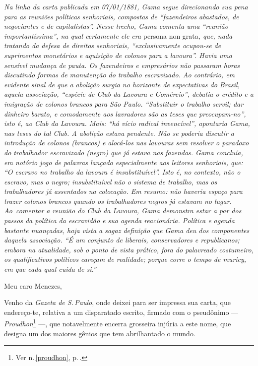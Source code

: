 {\begin{resumo}
\emph{Na linha da carta publicada em 07/01/1881, Gama segue direcionando
sua pena para as reuniões políticas senhoriais, compostas de
``fazendeiros abastados, de negociantes e de capitalistas''. Nesse trecho,
Gama comenta uma ``reunião importantíssima'', na qual certamente ele era}
persona non grata\emph{, que, nada tratando da defesa de direitos senhoriais,
``exclusivamente ocupou-se de suprimentos monetários e aquisição de
colonos para a lavoura''. Havia uma sensível mudança de pauta. Os
fazendeiros e empresários não passaram horas discutindo formas de
manutenção do trabalho escravizado. Ao contrário, em evidente sinal de
que a abolição surgia no horizonte de expectativas do Brasil, aquela
associação, ``espécie de Club da Lavoura e Comércio'', debatia o crédito e
a imigração de colonos brancos para São Paulo. ``Substituir o trabalho
servil; dar dinheiro barato, e comodamente aos lavradores são as teses
que preocupam-no'', isto é, ao Club da Lavoura. Mais: ``há vício radical
invencível'', apontaria Gama, nas teses do tal Club. A abolição estava
pendente. Não se poderia discutir a introdução de colonos (brancos) e
alocá-los nas lavouras sem resolver o paradoxo do trabalhador
escravizado (negro) que já estava nas fazendas. Gama concluía, em
notório jogo de palavras lançado especialmente aos leitores senhoriais,
que: ``O escravo no trabalho da lavoura é insubstituível''. Isto é, no
contexto, não o escravo, mas o negro; insubstituível não o sistema de
trabalho, mas os trabalhadores já assentados na colocação. Em resumo:
não haveria espaço para trazer colonos brancos quando os trabalhadores
negros já estavam no lugar. Ao~comentar a reunião do Club da Lavoura,
Gama demonstra estar a par dos passos da política da escravidão e sua
agenda reacionária. Política e agenda bastante nuançadas, haja vista a
sagaz definição que Gama deu dos componentes daquela associação. ``É um
conjunto de liberais, conservadores e republicanos; embora na
atualidade, sob o ponto de vista prático, fora do palavreado costumeiro,
os qualificativos políticos careçam de realidade; porque corre o tempo
de muricy, em que cada qual cuida de si.''}
\end{resumo}\pagebreak

Meu caro Menezes,

Venho da \emph{Gazeta de S.\,Paulo}, onde deixei para ser impressa sua
carta, que endereço-te, relativa a um disparatado escrito, firmado com o
pseudônimo --- \emph{Proudhon}\footnote{Ver n.\,\ref{proudhon}, p.\,\pageref{proudhon}.}
---, que notavelmente encerra grosseira injúria a este nome, que
designa um dos maiores gênios que tem abrilhantado o mundo.

}
